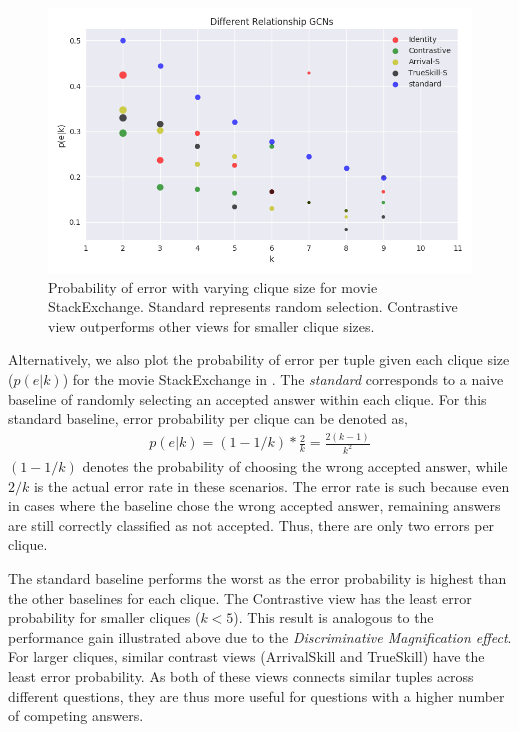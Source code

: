 \begin{figure}[h]
      \centering
  \includegraphics[scale=0.55]{figures/ErrorPlot.png}
  \caption{\label{fig:error} Probability of error with varying clique size for movie StackExchange. Standard represents random selection. Contrastive view outperforms other views for smaller clique sizes.  }
\end{figure}

Alternatively, we also plot the probability of error per tuple given each clique size ($p(e|k)$) for the movie StackExchange in . The \emph{standard} corresponds to a naive baseline of randomly selecting an accepted answer within each clique. For this standard baseline, error probability per clique can be denoted as,
\begin{align}
p(e|k) = (1 - 1/k) * \frac{2}{k} = \frac{2(k-1)}{k^2}
\end{align}
$(1 - 1/k)$ denotes the probability of choosing the wrong accepted answer, while $2/k$ is the actual error rate in these scenarios. The error rate is such because even in cases where the baseline chose the wrong accepted answer, remaining answers are still correctly classified as not accepted. Thus, there are only two errors per clique.

The standard baseline performs the worst as the error probability is highest than the other baselines for each clique. The Contrastive view has the least error probability for smaller cliques ($k<5$). This result is analogous to the performance gain illustrated above due to the \emph{Discriminative Magnification effect}. For larger cliques, similar contrast views (ArrivalSkill and TrueSkill) have the least error probability. As both of these views connects similar tuples across different questions, they are thus more useful for questions with a higher number of competing answers.



